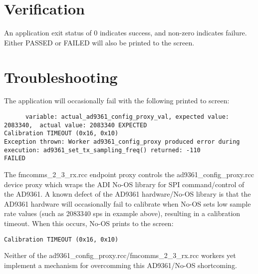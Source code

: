 \section{Verification}
An application exit status of 0 indicates success, and non-zero indicates failure. Either PASSED or FAILED will also be printed to the screen.

\section{Troubleshooting}
The application will occasionally fail with the following printed to screen:
\begin{lstlisting}
      variable: actual_ad9361_config_proxy_val, expected value: 2083340,  actual value: 2083340 EXPECTED
Calibration TIMEOUT (0x16, 0x10)
Exception thrown: Worker ad9361_config_proxy produced error during execution: ad9361_set_tx_sampling_freq() returned: -110
FAILED
\end{lstlisting}
The fmcomms\_2\_3\_rx.rcc endpoint proxy controls the ad9361\_config\_proxy.rcc device proxy which wraps the ADI No-OS library for SPI command/control of the AD9361. A known defect of the AD9361 hardware/No-OS library is that the AD9361 hardware will occasionally fail to calibrate when No-OS sets low sample rate values (such as 2083340 sps in example above), resulting in a calibration timeout. When this occurs, No-OS prints to the screen:
\begin{lstlisting}
Calibration TIMEOUT (0x16, 0x10)
\end{lstlisting}
Neither of the ad9361\_config\_proxy.rcc/fmcomms\_2\_3\_rx.rcc workers yet implement a mechanism for overcomming this AD9361/No-OS shortcoming.



